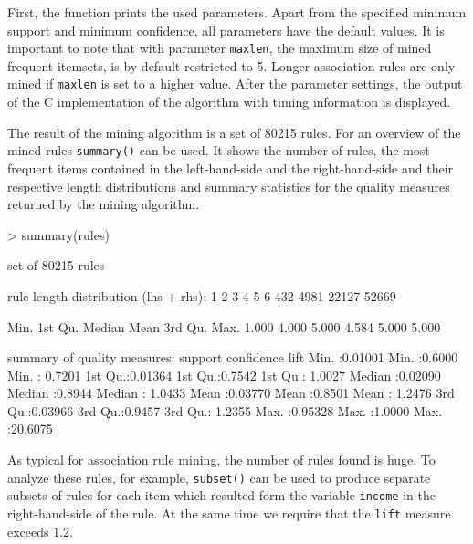 \documentclass[10pt,a4paper]{article}
\newcommand{\func}[1]{\mbox{\texttt{#1()}}}
\newcommand{\code}[1]{\mbox{\texttt{#1}}}
\newcommand{\proglang}[1]{\textsf{#1}}
\begin{document}
%

First, the function prints the used parameters.  Apart from the
specified minimum support and minimum confidence, all parameters have
the default values. It is important to note that with parameter
\code{maxlen}, the maximum size of mined frequent itemsets, is by
default restricted to 5.  Longer association rules are only mined if
\code{maxlen} is set to a higher value.  After the parameter settings,
the output of the \proglang{C} implementation of the algorithm with timing
information is displayed.

The result of the mining algorithm is a set of 80215
rules.  For an overview of the mined rules \func{summary}
can be used.   It shows the number of rules, the most frequent items
contained in the left-hand-side and the right-hand-side and their
respective length distributions and summary statistics for the quality
measures returned by the mining algorithm.

\begin{Schunk}
\begin{Sinput}
> summary(rules)
\end{Sinput}
\begin{Soutput}
set of 80215 rules

rule length distribution (lhs + rhs):
    1     2     3     4     5 
    6   432  4981 22127 52669 

   Min. 1st Qu.  Median    Mean 3rd Qu.    Max. 
  1.000   4.000   5.000   4.584   5.000   5.000 

summary of quality measures:
    support          confidence          lift        
 Min.   :0.01001   Min.   :0.6000   Min.   : 0.7201  
 1st Qu.:0.01364   1st Qu.:0.7542   1st Qu.: 1.0027  
 Median :0.02090   Median :0.8944   Median : 1.0433  
 Mean   :0.03770   Mean   :0.8501   Mean   : 1.2476  
 3rd Qu.:0.03966   3rd Qu.:0.9457   3rd Qu.: 1.2355  
 Max.   :0.95328   Max.   :1.0000   Max.   :20.6075  
\end{Soutput}
\end{Schunk}

As typical for association rule mining, the number of rules found is
huge.  To analyze these rules, for example, \func{subset} can be used to
produce separate subsets of rules for each item which resulted form the
variable \code{income} in the right-hand-side of the rule. At the same
time we require that the \code{lift} measure exceeds $1.2$.
\end{document}
